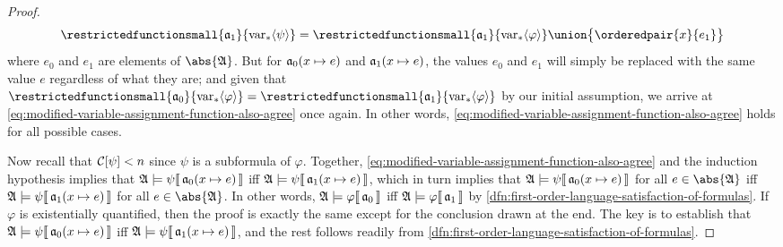 \begin{proof}
\begin{align*}
        \restrictedfunctionsmall{\mathfrak{a}_{1}}{\folfreevars{\psi}} = \restrictedfunctionsmall{\mathfrak{a}_{1}}{\folfreevars{\varphi}} \union \big\{ \orderedpair{x}{e_{1}} \big\}
    \end{align*}
    where \( e_{0} \) and \( e_{1} \) are elements of \( \abs{\mathfrak{A}} \). But for \( \folmodifiedvariableassignmentfunction{\mathfrak{a}_{0}}{x}{e} \) and
    \( \folmodifiedvariableassignmentfunction{\mathfrak{a}_{1}}{x}{e} \), the values \( e_{0} \) and \( e_{1} \) will simply be replaced with the same value \( e \)
    regardless of what they are; and given that \( \restrictedfunctionsmall{\mathfrak{a}_{0}}{\folfreevars{\varphi}} =  \restrictedfunctionsmall{\mathfrak{a}_{1}}{\folfreevars{\varphi}} \)
    by our initial assumption, we arrive at \eqref{eq:modified-variable-assignment-function-also-agree} once again. In other words, \eqref{eq:modified-variable-assignment-function-also-agree} holds for all possible cases.

    \vspace{0.3cm}
    \noindent
    Now recall that \( \folcomplexityofformula{\psi} < n \) since \( \psi \) is a subformula of \( \varphi \).
    Together, \eqref{eq:modified-variable-assignment-function-also-agree} and the induction hypothesis implies that
    \( \folwffsatisfaction{\mathfrak{A}}{\psi}{ \folmodifiedvariableassignmentfunction{\mathfrak{a}_{0}}{x}{e} } \)
    iff \( \folwffsatisfaction{\mathfrak{A}}{\psi}{ \folmodifiedvariableassignmentfunction{\mathfrak{a}_{1}}{x}{e} } \),
    which in turn implies that 
    \( \folwffsatisfaction{\mathfrak{A}}{\psi}{ \folmodifiedvariableassignmentfunction{\mathfrak{a}_{0}}{x}{e} } \) 
    for all \( e \in \abs{\mathfrak{A}} \) iff \( \folwffsatisfaction{\mathfrak{A}}{\psi}{ \folmodifiedvariableassignmentfunction{\mathfrak{a}_{1}}{x}{e} } \)
    for all \( e \in \abs{\mathfrak{A}} \).
    In other words, \(  \mathfrak{A} \models \varphi\llbracket\, \mathfrak{a}_{0} \,\rrbracket \) iff \(  \mathfrak{A} \models \varphi\llbracket\, \mathfrak{a}_{1} \,\rrbracket \)
    by \cref{dfn:first-order-language-satisfaction-of-formulas}.
    If \( \varphi \) is existentially quantified, then the proof is exactly the same except for the conclusion drawn at the end.
    The key is to establish that \( \folwffsatisfaction{\mathfrak{A}}{\psi}{ \folmodifiedvariableassignmentfunction{\mathfrak{a}_{0}}{x}{e} } \)
    iff \( \folwffsatisfaction{\mathfrak{A}}{\psi}{ \folmodifiedvariableassignmentfunction{\mathfrak{a}_{1}}{x}{e} } \), and the rest follows readily from
    \cref{dfn:first-order-language-satisfaction-of-formulas}.


\end{proof}
